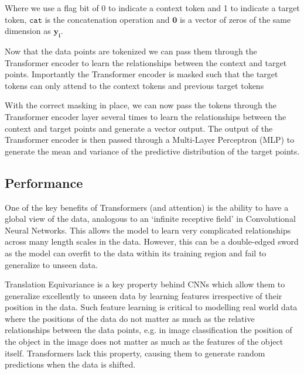 \documentclass[../../main.tex]{subfiles}
\begin{document}
Where we use a flag bit of 0 to indicate a context token and 1 to indicate a target token, $\texttt{cat}$ is the concatenation operation and $\bm{0}$ is a vector of zeros of the same dimension as $\bm{y_i}$.

Now that the data points are tokenized we can pass them through the Transformer encoder to learn the relationships between the context and target points. Importantly the Transformer encoder is masked such that the target tokens can only attend to the context tokens and previous target tokens


With the correct masking in place, we can now pass the tokens through the Transformer encoder layer several times to learn the relationships between the context and target points and generate a vector output. The output of the Transformer encoder is then passed through a Multi-Layer Perceptron (MLP) to generate the mean and variance of the predictive distribution of the target points. 


\subsection{Performance}

One of the key benefits of Transformers (and attention) is the ability to have a global view of the data, analogous to an `infinite receptive field' in Convolutional Neural Networks. This allows the model to learn very complicated relationships across many length scales in the data. However, this can be a double-edged sword as the model can overfit to the data within its training region and fail to generalize to unseen data. 

Translation Equivariance is a key property behind CNNs which allow them to generalize excellently to unseen data by learning features irrespective of their position in the data. Such feature learning is critical to modelling real world data where the positions of the data do not matter as much as the relative relationships between the data points, e.g. in image classification the position of the object in the image does not matter as much as the features of the object itself. Transformers lack this property, causing them to generate random predictions when the data is shifted. 

\end{document}
